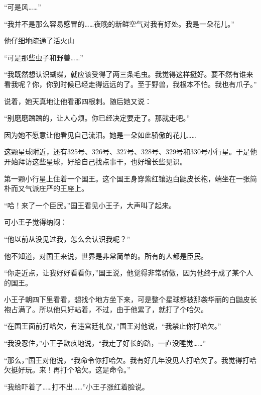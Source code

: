 “可是风\ldots{}\ldots{}”

“我并不是那么容易感冒的\ldots{}\ldots{}夜晚的新鲜空气对我有好处。我是一朵花儿。”

{\startalignment[center]
 \stopalignment}

他仔细地疏通了活火山

“可是那些虫子和野兽\ldots{}\ldots{}”

“我既然想认识蝴蝶，就应该受得了两三条毛虫。我觉得这样挺好。要不然有谁来看我呢？你，你到时候已经走得远远的了。至于野兽，我根本不怕。我也有爪子。”

说着，她天真地让他看那四根刺。随后她又说：

“别磨磨蹭蹭的，让人心烦。你已经决定要走了。那就走吧。”

因为她不愿意让他看见自己流泪。她是一朵如此骄傲的花儿\ldots{}\ldots{}


\stoptitle

\starttitle[title={10},reference={part0012.html_a013}]

这颗星球附近，还有325号、326号、327号、328号、329号和330号小行星。于是他开始拜访这些星球，好给自己找点事干，也好增长些见识。

第一颗小行星上住着一个国王。这个国王身穿紫红镶边白鼬皮长袍，端坐在一张简朴而又气派庄严的王座上。

“哈！来了一个臣民。”国王看见小王子，大声叫了起来。

可小王子觉得纳闷：

“他以前从没见过我，怎么会认识我呢？”

他不知道，对国王来说，世界是非常简单的。所有的人都是臣民。

“你走近点，让我好好看看你，”国王说，他觉得非常骄傲，因为他终于成了某个人的国王。

小王子朝四下里看看，想找个地方坐下来，可是整个星球都被那袭华丽的白鼬皮长袍占满了。所以他只好站着，不过，由于他累了，就打了个哈欠。

“在国王面前打哈欠，有违宫廷礼仪，”国王对他说，“我禁止你打哈欠。”

“我没忍住，”小王子歉疚地说，“我走了好长的路，一直没睡觉\ldots{}\ldots{}”

“那么，”国王对他说，“我命令你打哈欠。我有好几年没见人打哈欠了。我觉得打哈欠挺好玩。来！再打个哈欠。这是命令。”

“我给吓着了\ldots{}\ldots{}打不出\ldots{}\ldots{}”小王子涨红着脸说。

